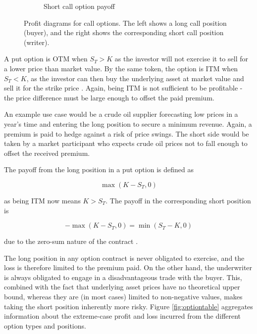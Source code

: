 \documentclass[english,12pt,a4paper,pdftex,sci,utf8]{aaltothesis}
\begin{document}
\begin{figure}[H]
\begin{subfigure}[t]{0.48\textwidth}
\caption{Short call option payoff}
\end{subfigure}

\caption{Profit diagrams for call options. The left shows a long call position (buyer), and the right shows the corresponding short call position (writer).}
\label{fig:call_option_diagrams}
\end{figure}


A put option is OTM when $S_T > K$ as the investor will not exercise it to sell for a lower price than market value. By the same token, the option is ITM when  $S_T < K$, as the investor can then buy the underlying asset at market value and sell it for the strike price \cite[p. 209]{hull2013fundamentals}. Again, being ITM is not sufficient to be profitable - the price difference must be large enough to offset the paid premium.

An example use case would be a crude oil supplier forecasting low prices in a year's time and entering the long position to secure a minimum revenue. Again, a premium is paid to hedge against a risk of price swings. The short side would be taken by a market participant who expects crude oil prices not to fall enough to offset the received premium.
\bigskip

The payoff from the long position in a put option is defined as

\begin{equation*}
    \max(K-S_T,0)
\end{equation*}

as being ITM now means $K > S_T$. The payoff in the corresponding short position is

\begin{equation}
    -\max(K-S_T,0) = \min(S_T-K,0)
\end{equation}

due to the zero-sum nature of the contract \cite[p. 10]{hull2016options}.

The long position in any option contract is never obligated to exercise, and the loss is therefore limited to the premium paid. On the other hand, the underwriter is always obligated to engage in a disadvantageous trade with the buyer. This, combined with the fact that underlying asset prices have no theoretical upper bound, whereas they are (in most cases) limited to non-negative values, makes taking the short position inherently more risky. Figure \ref{fig:optiontable} aggregates information about the extreme-case profit and loss incurred from the different option types and positions.
\end{document}
